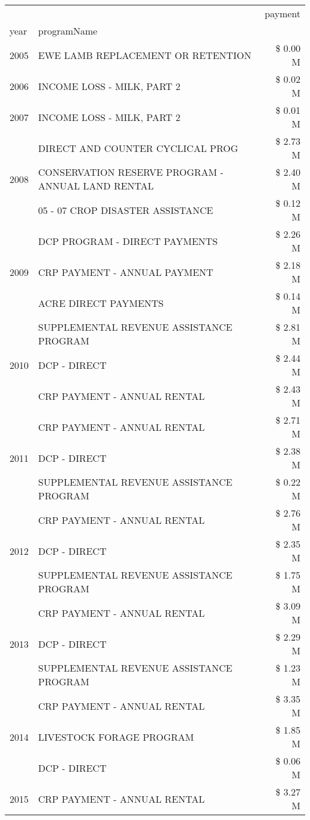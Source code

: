 \begin{tabular}{llr}
\toprule
 &  & payment \\
year & programName &  \\
\midrule
2005 & EWE LAMB REPLACEMENT OR RETENTION & \$ 0.00 M \\
\cline{1-3}
2006 & INCOME LOSS - MILK, PART 2 & \$ 0.02 M \\
\cline{1-3}
2007 & INCOME LOSS - MILK, PART 2 & \$ 0.01 M \\
\cline{1-3}
\multirow[t]{3}{*}{2008} & DIRECT AND COUNTER CYCLICAL PROG & \$ 2.73 M \\
 & CONSERVATION RESERVE PROGRAM - ANNUAL LAND RENTAL & \$ 2.40 M \\
 & 05 - 07 CROP DISASTER ASSISTANCE & \$ 0.12 M \\
\cline{1-3}
\multirow[t]{3}{*}{2009} & DCP PROGRAM - DIRECT PAYMENTS & \$ 2.26 M \\
 & CRP PAYMENT - ANNUAL PAYMENT & \$ 2.18 M \\
 & ACRE DIRECT PAYMENTS & \$ 0.14 M \\
\cline{1-3}
\multirow[t]{3}{*}{2010} & SUPPLEMENTAL REVENUE ASSISTANCE PROGRAM & \$ 2.81 M \\
 & DCP - DIRECT & \$ 2.44 M \\
 & CRP PAYMENT - ANNUAL RENTAL & \$ 2.43 M \\
\cline{1-3}
\multirow[t]{3}{*}{2011} & CRP PAYMENT - ANNUAL RENTAL & \$ 2.71 M \\
 & DCP - DIRECT & \$ 2.38 M \\
 & SUPPLEMENTAL REVENUE ASSISTANCE PROGRAM & \$ 0.22 M \\
\cline{1-3}
\multirow[t]{3}{*}{2012} & CRP PAYMENT - ANNUAL RENTAL & \$ 2.76 M \\
 & DCP - DIRECT & \$ 2.35 M \\
 & SUPPLEMENTAL REVENUE ASSISTANCE PROGRAM & \$ 1.75 M \\
\cline{1-3}
\multirow[t]{3}{*}{2013} & CRP PAYMENT - ANNUAL RENTAL & \$ 3.09 M \\
 & DCP - DIRECT & \$ 2.29 M \\
 & SUPPLEMENTAL REVENUE ASSISTANCE PROGRAM & \$ 1.23 M \\
\cline{1-3}
\multirow[t]{3}{*}{2014} & CRP PAYMENT - ANNUAL RENTAL & \$ 3.35 M \\
 & LIVESTOCK FORAGE PROGRAM & \$ 1.85 M \\
 & DCP - DIRECT & \$ 0.06 M \\
\cline{1-3}
\multirow[t]{3}{*}{2015} & CRP PAYMENT - ANNUAL RENTAL & \$ 3.27 M \\

\end{tabular}
